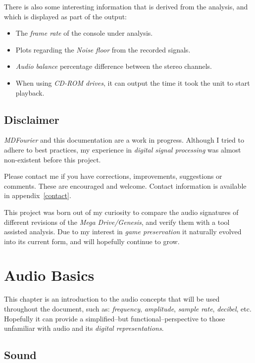 \documentclass[10pt,a4paper]{report}
\begin{document}
There is also some interesting information that is derived from the analysis, and which is displayed as part of the output:

\begin{itemize}
	\item The \textit{frame rate} of the console under analysis.
	\item Plots regarding the \textit{Noise floor} from the recorded signals.
	\item \textit{Audio balance} percentage difference between the stereo channels.
	\item When using \textit{CD-ROM drives}, it can output the time it took the unit to start playback.
\end{itemize}


\newpage
\section{Disclaimer}

\textit{MDFourier} and this documentation are a work in progress. Although I tried to adhere to best practices, my experience in \textit{digital signal processing} was almost non-existent before this project. 

Please contact me if you have corrections, improvements, suggestions or comments. These are encouraged and welcome. Contact information is available in appendix~\ref{contact}.

This project was born out of my curiosity to compare the audio signatures of different revisions of the \textit{Mega Drive/Genesis}, and verify them with a tool assisted analysis. Due to my interest in \textit{game preservation} it naturally evolved into its current form, and will hopefully continue to grow.

\chapter{Audio Basics}

This chapter is an introduction to the audio concepts that will be used throughout the document, such as: \textit{frequency}, \textit{amplitude}, \textit{sample rate}, \textit{decibel}, etc. Hopefully it can provide a simplified--but functional--perspective to those unfamiliar with audio and its \textit{digital representations}.

\section{Sound}
\end{document}
